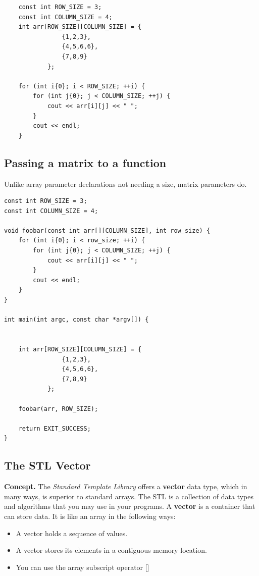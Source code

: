\documentclass{report}
\begin{document}
    \hspace{0.2in} 
    \begin{minipage}[t]{0.47\textwidth}
\bigbreak \noindent 
\sepline
\begin{verbatim}
    const int ROW_SIZE = 3;
    const int COLUMN_SIZE = 4;
    int arr[ROW_SIZE][COLUMN_SIZE] = {
                {1,2,3},
                {4,5,6,6},
                {7,8,9}
            };

    for (int i{0}; i < ROW_SIZE; ++i) {
        for (int j{0}; j < COLUMN_SIZE; ++j) {
            cout << arr[i][j] << " ";
        } 
        cout << endl;
    }
\end{verbatim}
\sepline
    
    \end{minipage}

    \pagebreak \bigbreak \noindent 
    \subsection{Passing a matrix to a function}
    \bigbreak \noindent 
    Unlike array parameter declarations not needing a size, matrix parameters do.
    \bigbreak \noindent 
    \sepline
    \begin{verbatim}
const int ROW_SIZE = 3;
const int COLUMN_SIZE = 4;

void foobar(const int arr[][COLUMN_SIZE], int row_size) {
    for (int i{0}; i < row_size; ++i) {
        for (int j{0}; j < COLUMN_SIZE; ++j) {
            cout << arr[i][j] << " ";
        }
        cout << endl;
    }
}

int main(int argc, const char *argv[]) {


    int arr[ROW_SIZE][COLUMN_SIZE] = {
                {1,2,3},
                {4,5,6,6},
                {7,8,9}
            };

    foobar(arr, ROW_SIZE);

    return EXIT_SUCCESS;
}
    \end{verbatim}
    \sepline

    \pagebreak \bigbreak \noindent 
    \subsection{The STL Vector}
    \bigbreak \noindent 
    \textbf{Concept. } The \textit{Standard Template Library} offers a \textbf{vector} data type, which in many ways, is superior to standard arrays.
    \bigbreak \noindent 
    The STL is a collection of data types and algorithms that you may use in your programs. 
    \bigbreak \noindent 
    A \textbf{vector} is a container that can store data. It is like an array in the following ways:
    \begin{itemize}
        \item A vector holds a sequence of values.
        \item A vector stores its elements in a contiguous memory location.
        \item You can use the array subscript operator []
    \end{itemize}
\end{document}
